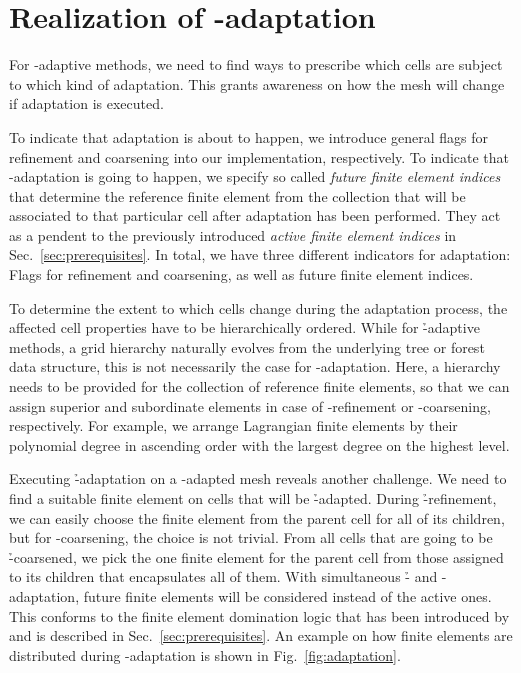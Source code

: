 \section{Realization of \hp-adaptation}
\label{sec:adaptation}

For \hp{}-adaptive methods, we need to find ways to prescribe which cells are subject to which kind of adaptation. This grants awareness on how the mesh will change if adaptation is executed.

To indicate that adaptation is about to happen, we introduce general flags for refinement and coarsening into our implementation, respectively. To indicate that \p-adaptation is going to happen, we specify so called \textit{future finite element indices} that determine the reference finite element from the collection that will be associated to that particular cell after adaptation has been performed. They act as a pendent to the previously introduced \textit{active finite element indices} in Sec.~\ref{sec:prerequisites}. In total, we have three different indicators for adaptation: Flags for refinement and coarsening, as well as future finite element indices.

To determine the extent to which cells change during the adaptation process, the affected cell properties have to be hierarchically ordered. While for \h-adaptive methods, a grid hierarchy naturally evolves from the underlying tree or forest data structure, this is not necessarily the case for \p-adaptation. Here, a hierarchy needs to be provided for the collection of reference finite elements, so that we can assign superior and subordinate elements in case of \p-refinement or \p-coarsening, respectively. For example, we arrange Lagrangian finite elements by their polynomial degree in ascending order with the largest degree on the highest level.

Executing \h-adaptation on a \p-adapted mesh reveals another challenge. We need to find a suitable finite element on cells that will be \h-adapted. During \h-refinement, we can easily choose the finite element from the parent cell for all of its children, but for \p-coarsening, the choice is not trivial. From all cells that are going to be \h-coarsened, we pick the one finite element for the parent cell from those assigned to its children that encapsulates all of them. With simultaneous \h- and \p-adaptation, future finite elements will be considered instead of the active ones. This conforms to the finite element domination logic that has been introduced by \textcite{bangerth2009} and is described in Sec.~\ref{sec:prerequisites}. An example on how finite elements are distributed during \hp-adaptation is shown in Fig.~\ref{fig:adaptation}.

